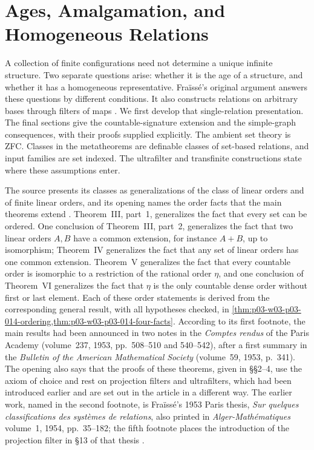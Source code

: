 \chapter{Ages, Amalgamation, and Homogeneous Relations}
\label{sec:p03-fraisse-1954}

A collection of finite configurations need not determine a unique infinite
structure. Two separate questions arise: whether it is the age of a structure,
and whether it has a homogeneous representative. Fra\"iss\'e's original
argument answers these questions by different conditions. It also constructs
relations on arbitrary bases through filters of maps
\cite[\S\S1--10, pp.~363--388]{Fraisse1954}.
We first develop that single-relation presentation. The final sections give
the countable-signature extension and the simple-graph consequences, with
their proofs supplied explicitly.
The ambient set theory is ZFC. Classes in the metatheorems are definable
classes of set-based relations, and input families are set indexed.
The ultrafilter and transfinite constructions state where these assumptions
enter.

The source presents its classes as generalizations of the class of linear
orders and of finite linear orders, and its opening names the order facts
that the main theorems extend \cite[\S1.1, pp.~363--364]{Fraisse1954}.
Theorem~III, part~1, generalizes the fact that every set can be ordered.
One conclusion of Theorem~III, part~2, generalizes the fact that two
linear orders \(A,B\) have a common extension, for instance \(A+B\),
up to isomorphism; Theorem~IV generalizes the fact that any set of
linear orders has one common extension. Theorem~V generalizes the fact
that every countable order is isomorphic to a restriction of the rational
order \(\eta\), and one conclusion of Theorem~VI generalizes the fact
that \(\eta\) is the only countable dense order without first or last
element. Each of these order statements is derived from the corresponding
general result, with all hypotheses checked, in
\cref{thm:p03-w03-p03-014-ordering,thm:p03-w03-p03-014-four-facts}.
According to its first footnote, the main results had been announced in
two notes in the \emph{Comptes rendus} of the Paris Academy (volume~237,
1953, pp.~508--510 and 540--542), after a first summary in the
\emph{Bulletin of the American Mathematical Society} (volume~59, 1953,
p.~341). The opening also says that the proofs of these theorems, given in
\S\S2--4, use the axiom of choice and rest on projection filters and ultrafilters,
which had been introduced earlier and are set out in the article in a
different way. The earlier work, named in the second footnote, is
Fra\"iss\'e's 1953 Paris thesis, \emph{Sur quelques classifications des
syst\`emes de relations}, also printed in \emph{Alger-Math\'ematiques}
volume~1, 1954, pp.~35--182; the fifth footnote places the introduction
of the projection filter in \S13 of that thesis
\cite[\S1.1 and nn.~1--2, p.~363; n.~5, p.~369]{Fraisse1954}.

